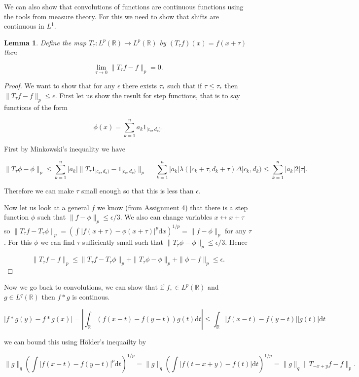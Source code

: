 \documentclass[
]{book}
\newtheorem{lemma}{Lemma}[chapter]
\theoremstyle{definition}
\theoremstyle{definition}
\theoremstyle{definition}
\theoremstyle{definition}
\theoremstyle{remark}
\begin{document}
We can also show that convolutions of functions are continuous functions using the tools from measure theory. For this we need to show that shifts are continuous in \(L^1\).

\begin{lemma}
Define the map \(T_\tau: L^p(\mathbb{R}) \rightarrow L^p(\mathbb{R})\) by \((T_\tau f)(x) = f(x+ \tau)\) then

\[ \lim_{\tau \rightarrow 0}\|T_\tau f - f\|_p = 0. \]
\end{lemma}

\begin{proof}
We want to show that for any \(\epsilon\) there exists \(\tau_*\) such that if \(\tau \leq \tau_*\) then \(\|T_\tau f-f\|_p \leq \epsilon\). First let us show the result for step functions, that is to say functions of the form

\[ \phi(x) = \sum_{k=1}^n a_k 1_{[c_k, d_k)}.\]

First by Minkowski's inequality we have

\[ \| T_\tau \phi - \phi\|_p \leq \sum_{k=1}^n |a_k| \| T_\tau 1_{[c_k, d_k)} - 1_{[c_k, d_k)}\|_p  = \sum_{k=1}^n |a_k| \lambda ([c_k + \tau, d_k + \tau) \Delta [c_k, d_k) \leq \sum_{k=1}^n |a_k| 2|\tau|.\]

Therefore we can make \(\tau\) small enough so that this is less than \(\epsilon\).

Now let us look at a general \(f\) we know (from Assignment 4) that there is a step function \(\phi\) such that \(\|f-\phi\|_p \leq \epsilon/3\). We also can change variables \(x \leftrightarrow x+\tau\) so \(\|T_\tau f - T_\tau \phi\|_p = \left( \int |f(x+\tau) - \phi(x+\tau)|^p \mathrm{d}x\right)^{1/p} = \|f-\phi\|_p\) for any \(\tau\). For this \(\phi\) we can find \(\tau\) sufficiently small such that \(\|T_\tau \phi - \phi\|_p \leq \epsilon/3\). Hence

\[ \|T_\tau f - f\|_p  \leq \|T_\tau f - T_\tau \phi\|_p + \| T_\tau \phi - \phi\|_p + \| \phi - f\|_p \leq \epsilon. \]
\end{proof}

Now we go back to convolutions, we can show that if \(f, \in L^p(\mathbb{R})\) and \(g \in L^q(\mathbb{R})\) then \(f*g\) is continous.

\[ |f*g(y) - f*g(x)| = |\int_{\mathbb{R}}(f(x-t) - f(y-t)) g(t) \mathrm{d}t| \leq \int_{\mathbb{R}} |f(x-t)-f(y-t)||g(t)| \mathrm{d}t  \]

we can bound this using Hölder's inequailty by

\[ \|g\|_q \left(\int |f(x-t) - f(y-t)|^p\mathrm{d}t\right)^{1/p} = \|g\|_q \left(\int |f(t-x+y) - f(t)| \mathrm{d}t\right)^{1/p} = \|g\|_q \| T_{-x+y} f - f\|_p. \]
\end{document}
